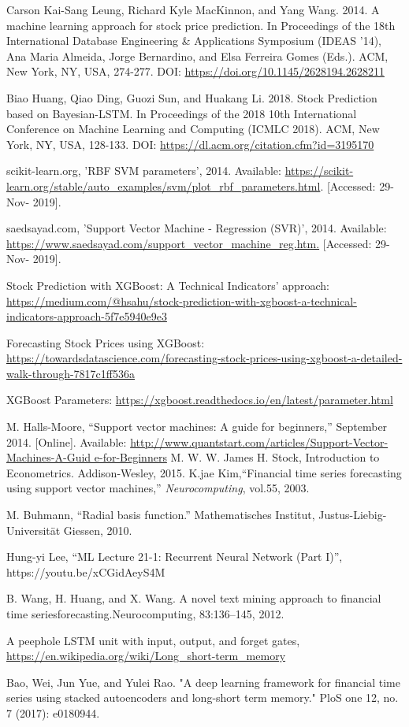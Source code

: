 \usepackage{fancyhdr}\documentclass[conference]{IEEEtran}
\begin{document}
\begin{thebibliography}{1}
Carson Kai-Sang Leung, Richard Kyle MacKinnon, and Yang Wang. 2014. A machine learning approach for stock price prediction. In Proceedings of the 18th International Database Engineering \& Applications Symposium (IDEAS '14), Ana Maria Almeida, Jorge Bernardino, and Elsa Ferreira Gomes (Eds.). ACM, New York, NY, USA, 274-277. DOI: \url{https://doi.org/10.1145/2628194.2628211}
 
Biao Huang, Qiao Ding, Guozi Sun, and Huakang Li. 2018. Stock Prediction based on Bayesian-LSTM. In Proceedings of the 2018 10th International Conference on Machine Learning and Computing (ICMLC 2018). ACM, New York, NY, USA, 128-133. DOI: \url{https://dl.acm.org/citation.cfm?id=3195170}

scikit-learn.org, 'RBF SVM parameters', 2014. Available: \url{https://scikit-learn.org/stable/auto_examples/svm/plot_rbf_parameters.html}. [Accessed: 29- Nov- 2019].

saedsayad.com, 'Support Vector Machine - Regression (SVR)', 2014. Available: \url{https://www.saedsayad.com/support_vector_machine_reg.htm.} [Accessed: 29- Nov- 2019].

Stock Prediction with XGBoost: A Technical Indicators’ approach: \url{https://medium.com/@hsahu/stock-prediction-with-xgboost-a-technical-indicators-approach-5f7e5940e9e3}

Forecasting Stock Prices using XGBoost: \url{https://towardsdatascience.com/forecasting-stock-prices-using-xgboost-a-detailed-walk-through-7817c1ff536a}

XGBoost Parameters:
\url{https://xgboost.readthedocs.io/en/latest/parameter.html}

M. Halls-Moore, “Support vector machines: A guide for beginners,” September 2014. [Online]. Available:
\url{http://www.quantstart.com/articles/Support-Vector-Machines-A-Guid e-for-Beginners}
M. W. W. James H. Stock, Introduction to Econometrics. Addison-Wesley, 2015.
K.jae Kim,“Financial time series forecasting using support vector machines,” \textit{Neurocomputing}, vol.55, 2003.

M. Buhmann, “Radial basis function.” Mathematisches Institut, Justus-Liebig-Universität Giessen, 2010.

Hung-yi Lee, “ML Lecture 21-1: Recurrent Neural Network (Part I)”, https://youtu.be/xCGidAeyS4M
 
B. Wang, H. Huang, and X. Wang.   A novel text mining approach to financial time seriesforecasting.Neurocomputing, 83:136–145, 2012.

A peephole LSTM unit with input, output, and forget   gates,  \url{https://en.wikipedia.org/wiki/Long_short-term_memory}


Bao, Wei, Jun Yue, and Yulei Rao. "A deep learning framework for financial time series using stacked autoencoders and long-short term memory." PloS one 12, no. 7 (2017): e0180944.

\end{thebibliography}




%
%
%
%
%
\end{document}
